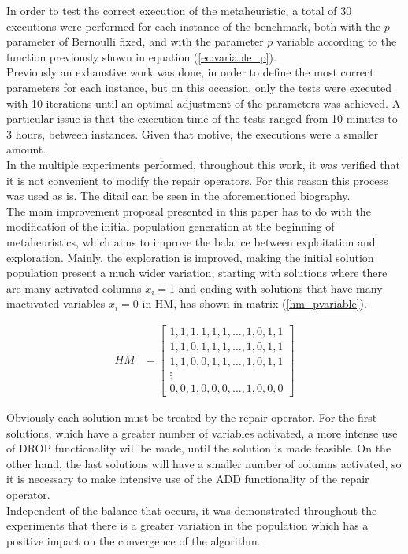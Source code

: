 In order to test the correct execution of the metaheuristic, a total of 30 executions were performed for each instance of the benchmark, both with the $p$ parameter of Bernoulli fixed, and with the parameter $p$ variable according to the function previously shown in equation (\ref{ec:variable_p}).\\

Previously an exhaustive work was done, in order to define the most correct parameters for each instance, but on this occasion, only the tests were executed with 10 iterations until an optimal adjustment of the parameters was achieved. A particular issue is that the execution time of the tests ranged from 10 minutes to 3 hours, between instances. Given that motive, the executions were a smaller amount.\\

In the multiple experiments performed, throughout this work, it was verified that it is not convenient to modify the repair operators. For this reason this 
process was used as is. The ditail can be seen in the aforementioned biography.\\

The main improvement proposal presented in this paper has to do with the modification of the initial population generation at the beginning of metaheuristics, which aims to improve the balance between exploitation and exploration. Mainly, the exploration is improved, making the initial solution population present a much wider variation, starting with solutions where there are many activated columns $x_i = 1$ and ending with solutions that have many inactivated variables $x_i = 0$ in HM, has shown in matrix (\ref{hm_pvariable}).

\begin{align}
    	HM &= \begin{bmatrix}  1,1,1,1,1,1, \ldots,1,0,1,1\\
    			     	1,1,0,1,1,1, \ldots,1,0,1,1 \\ 
                              	1,1,0,0,1,1, \ldots, 1,0,1,1 \\
				\vdots \\
    			     	0,0,1,0,0,0, \ldots,1,0,0,0 
	\end{bmatrix}
	\label{hm_pvariable}
\end{align}

Obviously each solution must be treated by the repair operator. For the first solutions, which have a greater number of variables activated, a more intense use of DROP functionality will be made, until the solution is made feasible. On the other hand, the last solutions will have a smaller number of columns activated, so it is necessary to make intensive use of the ADD functionality of the repair operator.\\

Independent of the balance that occurs, it was demonstrated throughout the experiments that there is a greater variation in the population which has a positive impact on the convergence of the algorithm.